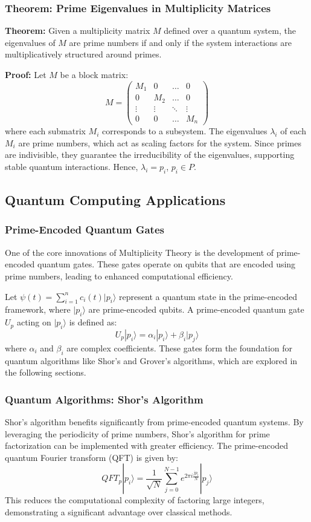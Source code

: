 \documentclass[%
 preprint, linenumbers,
 amsmath,amssymb,
 aps, physrev,
]{revtex4-2}
\begin{document}
\subsubsection{Theorem: Prime Eigenvalues in Multiplicity Matrices}
\textbf{Theorem:} Given a multiplicity matrix \( M \) defined over a quantum system, the eigenvalues of \( M \) are prime numbers if and only if the system interactions are multiplicatively structured around primes.

\textbf{Proof:} Let \( M \) be a block matrix:
\[
M = \begin{pmatrix} M_1 & 0 & \dots & 0 \\ 0 & M_2 & \dots & 0 \\ \vdots & \vdots & \ddots & \vdots \\ 0 & 0 & \dots & M_n \end{pmatrix}
\]
where each submatrix \( M_i \) corresponds to a subsystem. The eigenvalues \( \lambda_i \) of each \( M_i \) are prime numbers, which act as scaling factors for the system. Since primes are indivisible, they guarantee the irreducibility of the eigenvalues, supporting stable quantum interactions. Hence, \( \lambda_i = p_i \), \( p_i \in P \).

\subsection{Quantum Computing Applications}
\subsubsection{Prime-Encoded Quantum Gates}
One of the core innovations of Multiplicity Theory is the development of prime-encoded quantum gates. These gates operate on qubits that are encoded using prime numbers, leading to enhanced computational efficiency.

Let \( \psi(t) = \sum_{i=1}^{n} c_i(t) | p_i \rangle \) represent a quantum state in the prime-encoded framework, where \( | p_i \rangle \) are prime-encoded qubits. A prime-encoded quantum gate \( U_p \) acting on \( | p_i \rangle \) is defined as:
\[
U_p | p_i \rangle = \alpha_i | p_i \rangle + \beta_i | p_j \rangle
\]
where \( \alpha_i \) and \( \beta_i \) are complex coefficients. These gates form the foundation for quantum algorithms like Shor's and Grover's algorithms, which are explored in the following sections.

\subsubsection{Quantum Algorithms: Shor's Algorithm}
Shor's algorithm benefits significantly from prime-encoded quantum systems. By leveraging the periodicity of prime numbers, Shor's algorithm for prime factorization can be implemented with greater efficiency. The prime-encoded quantum Fourier transform (QFT) is given by:
\[
QFT_p | p_i \rangle = \frac{1}{\sqrt{N}} \sum_{j=0}^{N-1} e^{2\pi i \frac{j p_i}{N}} | p_j \rangle
\]
This reduces the computational complexity of factoring large integers, demonstrating a significant advantage over classical methods.
\end{document}
